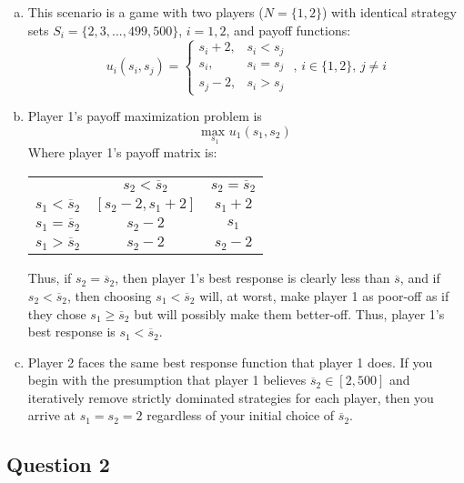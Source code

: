 \documentclass{article}
\newcommand{\usmax}[1]{\underset{#1}{\text{max }}}
\begin{document}
\begin{enumerate}[(a)]
	\item This scenario is a game with two players ($N=\{1,2\}$) with identical strategy sets ${S_i=\{2,3,...,499,500\}}$, $i=1,2$, and payoff functions:
		\[
			u_i(s_i,s_j) = \begin{cases} s_i + 2, & s_i<s_j \\ s_i, & s_i = s_j \\ s_j - 2, & s_i>s_j \end{cases}\text{ , }i\in\{1,2\}\text{, }j\neq i
		\]
		
	\item Player 1's payoff maximization problem is 
		\[
			\usmax{s_1}u_1(s_1,s_2)
		\]
		Where player 1's payoff matrix is:
		\begin{center}
			\begin{tabular}{rcc}
									& $s_2 < \overline{s}_2$						& $s_2 = \overline{s}_2$			\\ \cline{2-3} 
			$s_1 < \overline{s}_2$	& \multicolumn{1}{|c|}{$[s_2 -2, s_1 + 2]$}		& \multicolumn{1}{|c|}{$s_1 + 2$}	\\ \cline{2-3}
			$s_1 = \overline{s}_2$	& \multicolumn{1}{|c|}{$s_2 - 2$}				& \multicolumn{1}{|c|}{$s_1$}		\\ \cline{2-3}
			$s_1 > \overline{s}_2$	& \multicolumn{1}{|c|}{$s_2 - 2$}				& \multicolumn{1}{|c|}{$s_2 - 2$}	\\ \cline{2-3}
			\end{tabular}
		\end{center}
		Thus, if $s_2=\overline{s}_2$, then player 1's best response is clearly less than $\overline{s}$, and if $s_2<\overline{s}_2$, then choosing $s_1<\overline{s}_2$ will, at worst, make player 1 as poor-off as if they chose $s_1\geq\overline{s}_2$ but will possibly make them better-off. Thus, player 1's best response is $s_1<\overline{s}_2$.
	
	\item Player 2 faces the same best response function that player 1 does. If you begin with the presumption that player 1 believes $\overline{s}_2\in[2,500]$ and iteratively remove strictly dominated strategies for each player, then you arrive at $s_1=s_2=2$ regardless of your initial choice of $\overline{s}_2$.
	
\end{enumerate}


\subsection*{Question 2}
\end{document}
